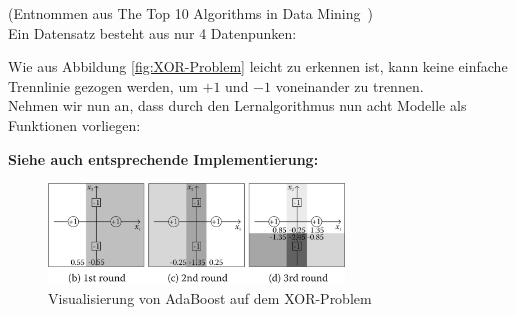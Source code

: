 (Entnommen aus \glqq The Top 10 Algorithms in Data Mining\grqq~\cite{WuKumar2009}) \\[10pt]
Ein Datensatz besteht aus nur 4 Datenpunken:


Wie aus Abbildung \ref*{fig:XOR-Problem} leicht zu erkennen ist, kann keine einfache Trennlinie gezogen werden, um
$+1$ und $-1$ voneinander zu trennen.\\
Nehmen wir nun an, dass durch den Lernalgorithmus nun acht Modelle als Funktionen vorliegen:


\textbf{Siehe auch entsprechende Implementierung: \cite{graf2023repository}}
\begin{figure}
    \centering
    \includegraphics[width=0.7\textwidth]{figures/XOR_Solution.png}
    \caption[]{Visualisierung von AdaBoost auf dem XOR-Problem}
    \label{fig:XOR-Solution}
\end{figure}